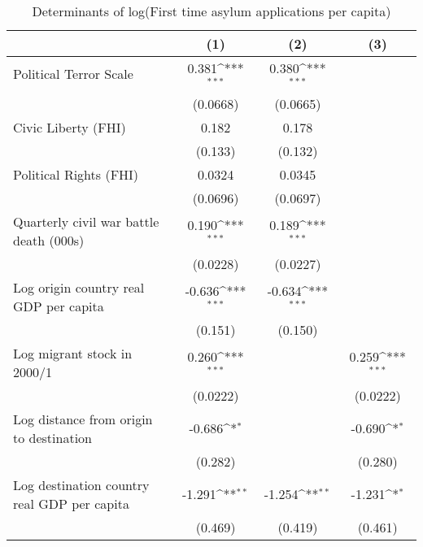 \begin{table}[htbp]\centering
\def\sym#1{\ifmmode^{#1}\else\(^{#1}\)\fi}
\caption{Determinants of log(First time asylum applications per capita)}
\begin{tabular}{l*{3}{c}}
\hline\hline
                    &\multicolumn{1}{c}{(1)}         &\multicolumn{1}{c}{(2)}         &\multicolumn{1}{c}{(3)}         \\
\hline
Political Terror Scale&       0.381\sym{***}&       0.380\sym{***}&                     \\
                    &    (0.0668)         &    (0.0665)         &                     \\
[1em]
Civic Liberty (FHI) &       0.182         &       0.178         &                     \\
                    &     (0.133)         &     (0.132)         &                     \\
[1em]
Political Rights (FHI)&      0.0324         &      0.0345         &                     \\
                    &    (0.0696)         &    (0.0697)         &                     \\
[1em]
Quarterly civil war battle death (000s)&       0.190\sym{***}&       0.189\sym{***}&                     \\
                    &    (0.0228)         &    (0.0227)         &                     \\
[1em]
Log origin country real GDP per capita&      -0.636\sym{***}&      -0.634\sym{***}&                     \\
                    &     (0.151)         &     (0.150)         &                     \\
[1em]
Log migrant stock in 2000/1&       0.260\sym{***}&                     &       0.259\sym{***}\\
                    &    (0.0222)         &                     &    (0.0222)         \\
[1em]
Log distance from origin to destination&      -0.686\sym{*}  &                     &      -0.690\sym{*}  \\
                    &     (0.282)         &                     &     (0.280)         \\
[1em]
Log destination country real GDP per capita&      -1.291\sym{**} &      -1.254\sym{**} &      -1.231\sym{*}  \\
                    &     (0.469)         &     (0.419)         &     (0.461)         \\

\end{tabular}
\end{table}

